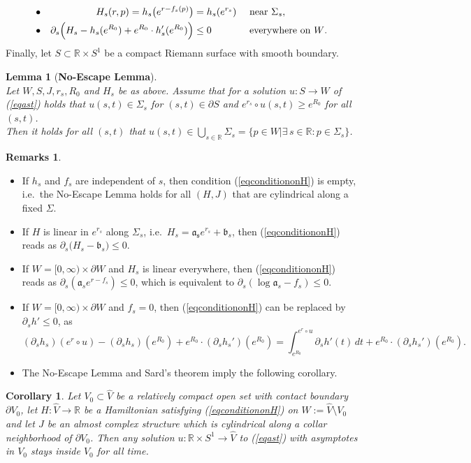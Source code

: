 \documentclass[a4paper,12pt,bibliography=totocnumbered,titlepage=false,abstracton,bookmarksnumbered=true]{scrartcl}
\newtheorem{lemme}[defn]{Lemma}
\newtheorem{cor}[defn]{Corollary}
\theoremstyle{definition}
\newtheorem*{rem}{Remarks}
\begin{document}
\begin{align}
 &\bullet& H_s(r,p)=h_s\big(e^{r-f_s(p)}\big)&=h_s(e^{r_s})&&\text{ near }\Sigma_s,\notag\\
 &\bullet&\label{eqconditiononH} \partial_s\Big(H_s-h_s(e^{R_0})+e^{R_0}\cdot h_s'(e^{R_0})\Big)&\leq 0&&\text{ everywhere on $W$.}
\end{align}
Finally, let $S\subset \mathbb{R}\times S^1$ be a compact Riemann surface with smooth boundary.
\begin{lemme}[\textbf{No-Escape Lemma}]\label{maxprinc}~\\
Let $W, S, J, r_s, R_0$ and $H_s$ be as above. Assume that for a solution $u: S\rightarrow W$ of (\ref{eqast}) holds that $u(s,t)\in\Sigma_s$ for $(s,t)\in\partial S$ and $e^{r_s}\circ u(s,t)\geq e^{R_0}$ for all $(s,t)$.\\
Then it holds for all $(s,t)$ that $ u(s,t)\in \bigcup_{s\in\mathbb{R}} \Sigma_s =\big\{p\in W\big|\exists\, s\in\mathbb{R}: p\in\Sigma_s\big\}$.
\end{lemme}
\begin{rem}~
\begin{itemize}
 \item If $h_s$ and $f_s$ are independent of $s$, then condition (\ref{eqconditiononH}) is empty, i.e.\ the No-Escape Lemma holds for all $(H,J)$ that are cylindrical along a fixed $\Sigma$.
 \item If $H$ is linear in $e^{r_s}$ along $\Sigma_s$, i.e.\ $H_s=\mathfrak{a_s}e^{r_s}+\mathfrak{b}_s$, then (\ref{eqconditiononH}) reads as $\partial_s\big(H_s-\mathfrak{b}_s)\leq 0$.
 \item If $W=[0,\infty)\times\partial W$ and $H_s$ is linear everywhere, then (\ref{eqconditiononH}) reads as $\partial_s (\mathfrak{a}_s e^{r-f_s})\leq 0$, which is equivalent to $\partial_s (\log \mathfrak{a}_s-f_s)\leq 0$.
 \item If $W=[0,\infty)\times\partial W$ and $f_s=0$, then (\ref{eqconditiononH}) can be replaced by $\partial_s h'\leq 0$, as
 \[(\partial_s h_s)(e^r\circ u)-(\partial_s h_s)(e^{R_0})+e^{R_0}\cdot (\partial_s h_s')(e^{R_0})=\int_{e^{R_0}}^{e^r\circ u}\partial_s h'(t)\,dt+e^{R_0}\cdot (\partial_s h_s')(e^{R_0}).\]
 \item The No-Escape Lemma and Sard's theorem imply the following corollary.
\end{itemize}
\end{rem}
\begin{cor}\label{Cornoesc}
 Let $V_0\subset \widehat{V}$ be a relatively compact open set with contact boundary $\partial V_0$, let $H: \widehat{V}\rightarrow \mathbb{R}$ be a Hamiltonian satisfying (\ref{eqconditiononH}) on $W:=\widehat{V}\setminus V_0$ and let $J$ be an almost complex structure which is cylindrical along a collar neighborhood of $\partial V_0$. Then any solution $u:\mathbb{R}\times S^1\rightarrow \widehat{V}$ to (\ref{eqast}) with asymptotes in $V_0$ stays inside $V_0$ for all time.
\end{cor}
\end{document}
